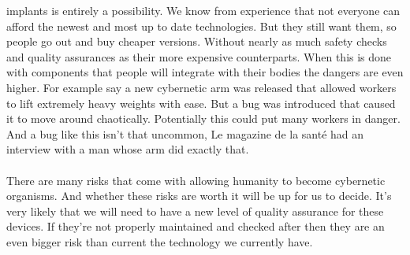 \documentclass[12pt,a4paper,notitlepage]{article}
\begin{document}
implants is entirely a possibility. We know from experience that not everyone
can afford the newest and most up to date technologies. But they still want
them, so people go out and buy cheaper versions. Without nearly as much safety
checks and quality assurances as their more expensive counterparts. When this is
done with components that people will integrate with their bodies the dangers
are even higher. For example say a new cybernetic arm was released that allowed
workers to lift extremely heavy weights with ease. But a bug was introduced that
caused it to move around chaotically. Potentially this could put many workers in
danger. And a bug like this isn't that uncommon, Le magazine de la sant\'{e} had
an interview with a man whose arm did exactly that. 
\\\\
There are many risks that come with allowing humanity to become cybernetic
organisms. And whether these risks are worth it will be up for us to decide.
It's very likely that we will need to have a new level of quality assurance for
these devices. If they're not properly maintained and checked after then they
are an even bigger risk than current the technology we currently have.
\\
\end{document}
